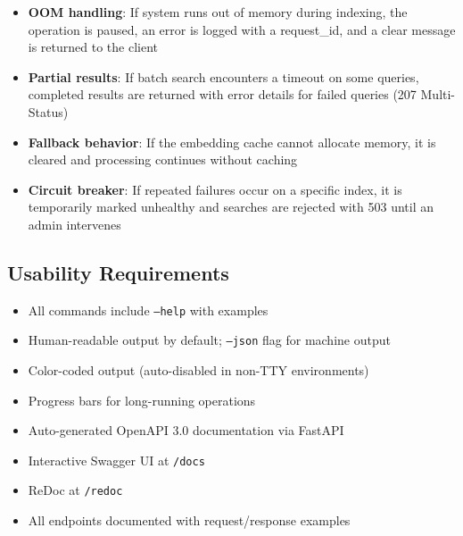 \documentclass[11pt,a4paper]{article}
\newcommand{\inlinecode}[1]{\texttt{\small\colorbox{ctCodeBg}{#1}}}
\newcommand{\apipath}[1]{\texttt{\small\textcolor{ctAccentBlue}{#1}}}
\begin{document}
\begin{reqbox}
\begin{itemize}
    \item \textbf{OOM handling}: If system runs out of memory during indexing, the operation is paused, an error is logged with a request\_id, and a clear message is returned to the client
    \item \textbf{Partial results}: If batch search encounters a timeout on some queries, completed results are returned with error details for failed queries (207 Multi-Status)
    \item \textbf{Fallback behavior}: If the embedding cache cannot allocate memory, it is cleared and processing continues without caching
    \item \textbf{Circuit breaker}: If repeated failures occur on a specific index, it is temporarily marked unhealthy and searches are rejected with 503 until an admin intervenes
\end{itemize}
\end{reqbox}

\subsection{Usability Requirements}

\begin{reqbox}
\begin{itemize}
    \item All commands include \inlinecode{--help} with examples
    \item Human-readable output by default; \inlinecode{--json} flag for machine output
    \item Color-coded output (auto-disabled in non-TTY environments)
    \item Progress bars for long-running operations
\end{itemize}
\end{reqbox}

\begin{reqbox}
\begin{itemize}
    \item Auto-generated OpenAPI 3.0 documentation via FastAPI
    \item Interactive Swagger UI at \apipath{/docs}
    \item ReDoc at \apipath{/redoc}
    \item All endpoints documented with request/response examples
\end{itemize}
\end{reqbox}
\end{document}
